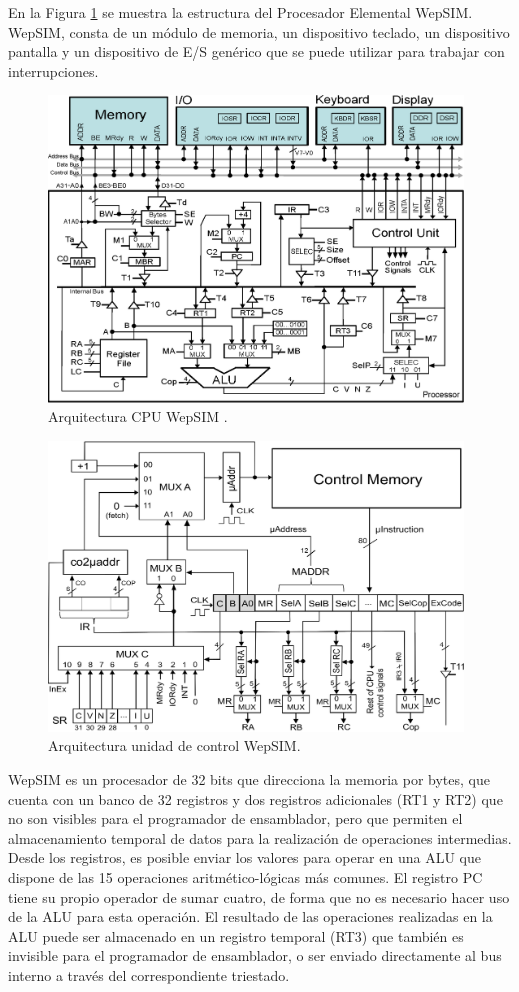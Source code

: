 En la Figura \ref{fig:wepsimCPU_figure} se muestra la estructura del Procesador Elemental WepSIM. WepSIM, consta de un módulo de memoria, un dispositivo teclado, un dispositivo pantalla y un dispositivo de E/S genérico que se puede utilizar para trabajar con interrupciones.

\begin{figure}[htbp]
 	\centering
 	\includegraphics[width=11cm]{figures/processor6}
 	\caption{Arquitectura CPU WepSIM .}
	\label{fig:wepsimCPU_figure}
\end{figure}

\begin{figure}[htbp]
 	\centering
 	\includegraphics[width=11cm]{figures/controlunit6}
 	\caption{Arquitectura unidad de control WepSIM.}
	\label{fig:wepsimCU_figure}
\end{figure}

WepSIM es un procesador de 32 bits que direcciona la memoria por bytes, que cuenta con un banco de 32 registros y dos registros adicionales (RT1 y RT2) que no son visibles para el programador de ensamblador, pero que permiten el almacenamiento temporal de datos para la realización de operaciones intermedias. Desde los registros, es posible enviar los valores para operar en una ALU que dispone de las 15 operaciones aritmético-lógicas más comunes. El registro PC tiene su propio operador de sumar cuatro, de forma que no es necesario hacer uso de la ALU para esta operación. El resultado de las operaciones realizadas en la ALU puede ser almacenado en un registro temporal (RT3) que también es invisible para el programador de ensamblador, o ser enviado directamente al bus interno a través del correspondiente triestado.

